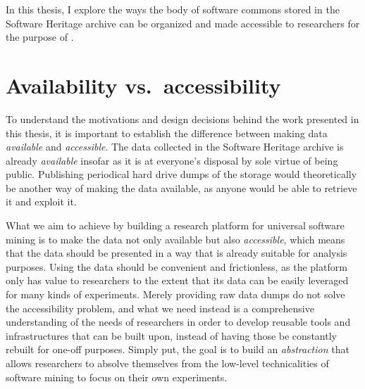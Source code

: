 In this thesis, I explore the ways the body of software commons stored in the
Software Heritage archive can be organized and made accessible to researchers
for the purpose of .

\section{Availability vs.\ accessibility}

To understand the motivations and design decisions behind the work presented in
this thesis, it is important to establish the difference between making data
\emph{available} and \emph{accessible}.  The data collected in the Software
Heritage archive is already \emph{available} insofar as it is at everyone's
disposal by sole virtue of being public. Publishing periodical hard drive dumps
of the storage would theoretically be another way of making the data available,
as anyone would be able to retrieve it and exploit it.

What we aim to achieve by building a research platform for universal software
mining is to make the data not only available but also \emph{accessible}, which
means that the data should be presented in a way that is already suitable for
analysis purposes. Using the data should be convenient and frictionless,
as the platform only has value to researchers to the extent that its data can
be easily leveraged for many kinds of experiments. Merely providing raw data
dumps do not solve the accessibility problem, and what we need instead is a
comprehensive understanding of the needs of researchers in order to develop
reusable tools and infrastructures that can be built upon, instead of having
those be constantly rebuilt for one-off purposes. Simply put, the goal is to
build an \emph{abstraction} that allows researchers to absolve themselves from
the low-level technicalities of software mining to focus on their own
experiments.
